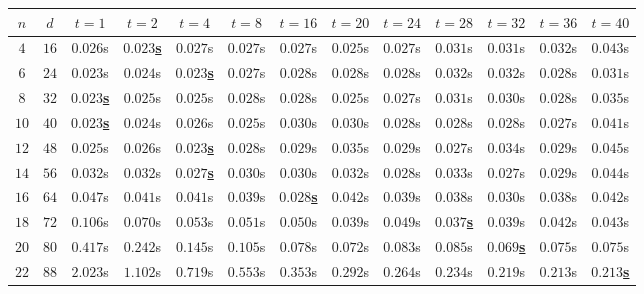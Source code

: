 \begin{table}[H]
    \centering
    \begin{adjustwidth}{-1.6cm}{-1.6cm}
    {\renewcommand{\arraystretch}{1.05}
        \setlength{\tabcolsep}{2.5pt}
        \small
        \begin{tabular}{ccccccccccccc}
            $n$ & $d$ & $t = 1$ & $t = 2$ & $t = 4$ & $t = 8$ & $t = 16$ & $t = 20$ & $t = 24$ & $t = 28$ & $t = 32$ & $t = 36$ & $t = 40$ \\
            \hline
            $4$ & $16$ & $0.026$s & \underline{$\mathbf{0.023}$\textbf{s}} & $0.027$s & $0.027$s & $0.027$s & $0.025$s & $0.027$s & $0.031$s & $0.031$s & $0.032$s & $0.043$s \\
            $6$ & $24$ & $0.023$s & $0.024$s & \underline{$\mathbf{0.023}$\textbf{s}} & $0.027$s & $0.028$s & $0.028$s & $0.028$s & $0.032$s & $0.032$s & $0.028$s & $0.031$s \\
            $8$ & $32$ & \underline{$\mathbf{0.023}$\textbf{s}} & $0.025$s & $0.025$s & $0.028$s & $0.028$s & $0.025$s & $0.027$s & $0.031$s & $0.030$s & $0.028$s & $0.035$s \\
            $10$ & $40$ & \underline{$\mathbf{0.023}$\textbf{s}} & $0.024$s & $0.026$s & $0.025$s & $0.030$s & $0.030$s & $0.028$s & $0.028$s & $0.028$s & $0.027$s & $0.041$s \\
            $12$ & $48$ & $0.025$s & $0.026$s & \underline{$\mathbf{0.023}$\textbf{s}} & $0.028$s & $0.029$s & $0.035$s & $0.029$s & $0.027$s & $0.034$s & $0.029$s & $0.045$s \\
            $14$ & $56$ & $0.032$s & $0.032$s & \underline{$\mathbf{0.027}$\textbf{s}} & $0.030$s & $0.030$s & $0.032$s & $0.028$s & $0.033$s & $0.027$s & $0.029$s & $0.044$s \\
            $16$ & $64$ & $0.047$s & $0.041$s & $0.041$s & $0.039$s & \underline{$\mathbf{0.028}$\textbf{s}} & $0.042$s & $0.039$s & $0.038$s & $0.030$s & $0.038$s & $0.042$s \\
            $18$ & $72$ & $0.106$s & $0.070$s & $0.053$s & $0.051$s & $0.050$s & $0.039$s & $0.049$s & \underline{$\mathbf{0.037}$\textbf{s}} & $0.039$s & $0.042$s & $0.043$s \\
            $20$ & $80$ & $0.417$s & $0.242$s & $0.145$s & $0.105$s & $0.078$s & $0.072$s & $0.083$s & $0.085$s & \underline{$\mathbf{0.069}$\textbf{s}} & $0.075$s & $0.075$s \\
            $22$ & $88$ & $2.023$s & $1.102$s & $0.719$s & $0.553$s & $0.353$s & $0.292$s & $0.264$s & $0.234$s & $0.219$s & $0.213$s & \underline{$\mathbf{0.213}$\textbf{s}} \\

\end{tabular}}
\end{adjustwidth}
\end{table}
